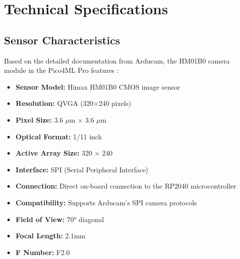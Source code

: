 \section{Technical Specifications}



\subsection{Sensor Characteristics}



Based on the detailed documentation from Arducam, the HM01B0 camera module in the Pico4ML Pro features \cite{Himax:2019}:



\begin{itemize}
    
    
    
    \item \textbf{Sensor Model:} Himax HM01B0 CMOS image sensor
    
    
    
    \item \textbf{Resolution:} QVGA (320×240 pixels)
    
    
    
    \item \textbf{Pixel Size:} 3.6 $\mu$m × 3.6 $\mu$m
    
    
    
    \item \textbf{Optical Format:} 1/11 inch
    
    
    
    \item \textbf{Active Array Size:} 320 × 240
    
    
    
    \item \textbf{Interface:} SPI (Serial Peripheral Interface)
    
    
    
    \item \textbf{Connection:} Direct on-board connection to the RP2040 microcontroller
    
    
    
    \item \textbf{Compatibility:} Supports Arducam's SPI camera protocols \cite{Arducam:2023}
    
    
    
    \item \textbf{Field of View:} 70° diagonal
    
    
    
    \item \textbf{Focal Length:} 2.1mm
    
    
    
    \item \textbf{F Number:} F2.0
    
    
    
\end{itemize}







